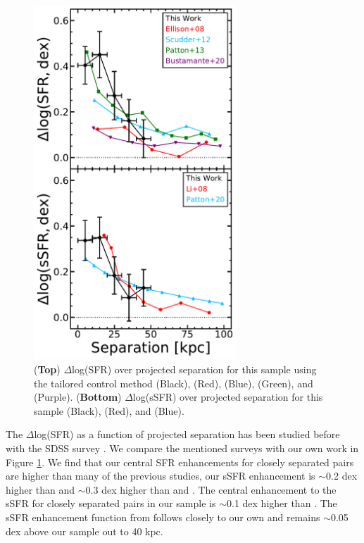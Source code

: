 \documentclass[iop,revtex4,twocolumn,apj,numberedappendix,appendixfloats]{emulateapj}
\begin{document}
\begin{figure}
\centering
\includegraphics[width=3in]{fig/nuc_sep.pdf}
\caption[]{(\textbf{Top}) $\Delta$log(SFR) over projected separation for this sample using the tailored control method (Black), \citet{Ellison:2008} (Red),  \citet{Scudder:2012} (Blue), \citet{Patton:2013} (Green), and \citet{Bustamante:2020} (Purple). (\textbf{Bottom}) $\Delta$log(sSFR) over projected separation for this sample (Black), \citet{Li:2008} (Red), and \citet{Patton:2020} (Blue).  }
\label{fig:nuc_sep}
\end{figure}

The $\Delta$log(SFR) as a function of projected separation has been studied before with the SDSS survey \citep{Ellison:2008, Li:2008, Patton:2013, Scudder:2012, Bustamante:2020}. We compare the mentioned surveys with our own work in Figure \ref{fig:nuc_sep}. We find that our central SFR enhancements for closely separated pairs are higher than many of the previous studies, our sSFR enhancement is $\sim$0.2 dex higher than \citet{Scudder:2012} and $\sim$0.3 dex higher than \citet{Ellison:2008} and \citet{Bustamante:2020}. The central enhancement to the sSFR for closely separated pairs in our sample is $\sim$0.1 dex higher than \citet{Patton:2013}. The sSFR enhancement function from \citet{Li:2008} follows closely to our own and remains $\sim$0.05 dex above our sample out to 40 kpc.  
\end{document}
